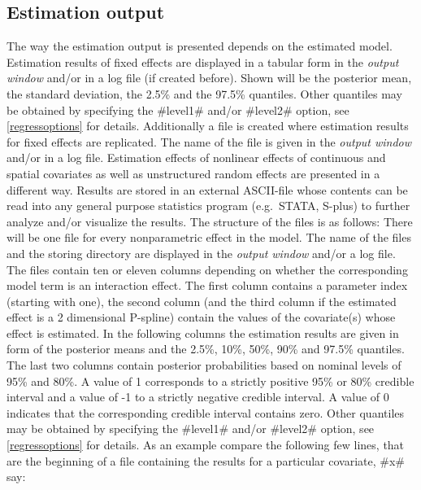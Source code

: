 \subsection{Estimation output}

The way the estimation output is presented depends on the
estimated model. Estimation results of fixed effects are displayed
in a tabular form in the {\em output window} and/or in a log file
(if created before). Shown will be the posterior mean, the
standard deviation, the 2.5\% and the 97.5\% quantiles. Other
quantiles may be obtained by specifying the #level1# and/or
#level2# option, see \autoref{regressoptions} for details.
Additionally a file is created where estimation results for fixed
effects are replicated. The name of the file is given in the {\em
output window} and/or in a log file. Estimation effects of
nonlinear effects of continuous and spatial covariates as well as
unstructured random effects are presented in a different way.
Results are stored in an external ASCII-file whose contents can be
read into any general purpose statistics program (e.g.~STATA,
S-plus) to further analyze and/or visualize the results. The
structure of the files is as follows: There will be one file for
every nonparametric effect in the model. The name of the files and
the storing directory are displayed in the {\em output window}
and/or a log file. The files contain ten or eleven columns
depending on whether the corresponding model term is an
interaction effect. The first column contains a parameter index
(starting with one), the second column (and the third column if
the estimated effect is a 2 dimensional P-spline) contain the
values of the covariate(s) whose effect is estimated. In the
following columns the estimation results are given in form of the
posterior means and the 2.5\%, 10\%, 50\%, 90\% and 97.5\%
quantiles. The last two columns contain posterior probabilities
based on nominal levels of 95\% and 80\%. A value of 1 corresponds
to a strictly positive 95\% or 80\% credible interval and a value of
-1 to a strictly negative credible interval. A value of 0
indicates that the corresponding credible interval contains zero.
Other quantiles may be obtained by specifying the #level1# and/or
#level2# option, see \autoref{regressoptions} for details. As an
example compare the following few lines, that are the beginning of
a file containing the results for a particular covariate, #x# say:


